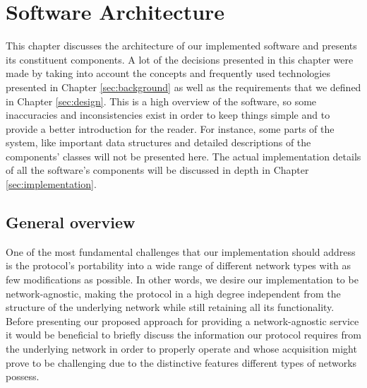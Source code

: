 \documentclass[a4paper,11pt,twoside]{report}
\begin{document}
\chapter{Software Architecture}
\label{sec:architecture}

This chapter discusses the architecture of our implemented software and presents its constituent components. A lot of the decisions presented in this chapter were made by taking into account the concepts and frequently used technologies presented in Chapter \ref{sec:background} as well as the requirements that we defined in Chapter \ref{sec:design}. This is a high overview of the software, so some inaccuracies and inconsistencies exist in order to keep things simple and to provide a better introduction for the reader. For instance, some parts of the system, like important data structures and detailed descriptions of the components' classes will not be presented here. The actual implementation details of all the software's components will be discussed in depth in Chapter \ref{sec:implementation}.

\section{General overview}

One of the most fundamental challenges that our implementation should address is the protocol's portability into a wide range of different network types with as few modifications as possible. In other words, we desire our implementation to be network-agnostic, making the protocol in a high degree independent from the structure of the underlying network while still retaining all its functionality. \\


Before presenting our proposed approach for providing a network-agnostic service it would be beneficial to briefly discuss the information our protocol requires from the underlying network in order to properly operate and whose acquisition might prove to be challenging due to the distinctive features different types of networks possess.\\
\end{document}
